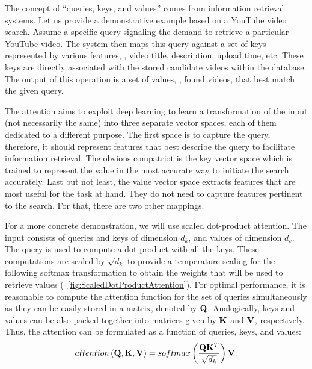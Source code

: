 The concept of ``queries, keys, and values'' comes from information retrieval systems. Let us provide a demonstrative example based on a YouTube video search. Assume a specific query signaling the demand to retrieve a particular YouTube video. The system then maps this query against a set of keys represented by various features, \egtext{}, video title, description, upload time, etc. These keys are directly associated with the stored candidate videos within the database. The output of this operation is a set of values, \ietext{}, found videos, that best match the given query.

The attention aims to exploit deep learning to learn a transformation of the input (not necessarily the same) into three separate vector spaces, each of them dedicated to a different purpose. The first space is to capture the query, therefore, it should represent features that best describe the query to facilitate information retrieval. The obvious compatriot is the key vector space which is trained to represent the value in the most accurate way to initiate the search accurately. Last but not least, the value vector space extracts features that are most useful for the task at hand. They do not need to capture features pertinent to the search. For that, there are two other mappings.

For a more concrete demonstration, we will use scaled dot-product attention. The input consists of queries and keys of dimension $d_k$, and values of dimension $d_v$. The query is used to compute a dot product with all the keys. These computations are scaled by $\sqrt{d_k}$ to provide a temperature scaling for the following softmax transformation to obtain the weights that will be used to retrieve values (\figtext{}~\ref{fig:ScaledDotProductAttention}). For optimal performance, it is reasonable to compute the attention function for the set of queries simultaneously as they can be easily stored in a matrix, denoted by $\mathbf{Q}$. Analogically, keys and values can be also packed together into matrices given by $\mathbf{K}$ and $\mathbf{V}$, respectively. Thus, the attention can be formulated as a function of queries, keys, and values:
\begin{equation}
    \label{eq:ScaledDotProductAttention}
    {attention} \left( \mathbf{Q}, \mathbf{K}, \mathbf{V} \right) =
    {softmax} \left( \frac{\mathbf{Q} \mathbf{K}^T}{\sqrt{d_k}} \right) \mathbf{V}.
\end{equation}

